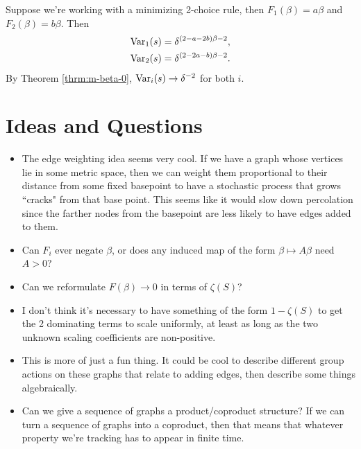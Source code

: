 \documentclass[twoside,10pt]{article}
\begin{document}
\begin{ex}[]
	Suppose we're working with a minimizing 2-choice rule, then $F_1(\beta) = a \beta$ and $F_2(\beta)=b \beta$. Then
	\begin{align*}
		\operatorname{Var}_1(s) &= \delta^{(2-a-2b)\beta-2},\\
		\operatorname{Var}_2(s) &= \delta^{(2-2a-b)\beta-2}.
	\end{align*}
	By Theorem \ref{thrm:m-beta-0}, $\operatorname{Var}_i(s) \to \delta^{-2}$ for both $i$. 
\end{ex}


\section{Ideas and Questions}

\begin{itemize}
	\item The edge weighting idea seems very cool. If we have a graph whose vertices lie in some metric space, then we can weight them proportional to their distance from some fixed basepoint to have a stochastic process that grows ``cracks" from that base point. This seems like it would slow down percolation since the farther nodes from the basepoint are less likely to have edges added to them.
	\item Can $F_i$ ever negate $\beta$, or does any induced map of the form $\beta \mapsto A \beta$ need $A > 0$?
	\item Can we reformulate $F(\beta)\to 0$ in terms of $\zeta(S)$?
	\item I don't think it's necessary to have something of the form $1-\zeta(S)$ to get the 2 dominating terms to scale uniformly, at least as long as the two unknown scaling coefficients are non-positive.
	\item This is more of just a fun thing. It could be cool to describe different group actions on these graphs that relate to adding edges, then describe some things algebraically.
	\item Can we give a sequence of graphs a product/coproduct structure? If we can turn a sequence of graphs into a coproduct, then that means that whatever property we're tracking has to appear in finite time.
\end{itemize}
\end{document}
